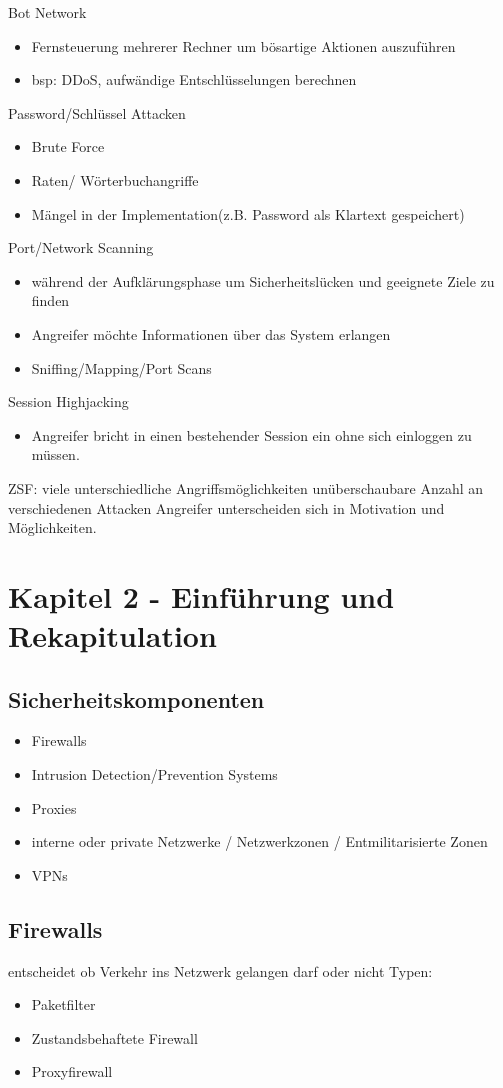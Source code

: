 \documentclass{article} %
\begin{document}
Bot Network
\begin{itemize}
	\item Fernsteuerung mehrerer Rechner um bösartige Aktionen auszuführen
    \item bsp: DDoS, aufwändige Entschlüsselungen berechnen
\end{itemize}
Password/Schlüssel Attacken
\begin{itemize}
	\item Brute Force
    \item Raten/ Wörterbuchangriffe
    \item Mängel in der Implementation(z.B. Password als Klartext gespeichert)
\end{itemize}
Port/Network Scanning

\begin{itemize}
	\item während der Aufklärungsphase um Sicherheitslücken und geeignete Ziele zu finden
    \item Angreifer möchte Informationen über das System erlangen
    \item Sniffing/Mapping/Port Scans
\end{itemize}
Session Highjacking
\begin{itemize}
	\item Angreifer bricht in einen bestehender Session ein ohne sich einloggen zu müssen.
\end{itemize}

ZSF: viele unterschiedliche Angriffsmöglichkeiten \Rightarrow unüberschaubare Anzahl an verschiedenen Attacken
Angreifer unterscheiden sich in Motivation und Möglichkeiten.
\chapter{Kapitel 2 - Einführung und Rekapitulation}
\section{Sicherheitskomponenten}
\begin{itemize}
	\item Firewalls
    \item Intrusion Detection/Prevention Systems
    \item Proxies
    \item interne oder private Netzwerke / Netzwerkzonen / Entmilitarisierte Zonen
    \item VPNs
\end{itemize}
\section{Firewalls}
entscheidet ob Verkehr ins Netzwerk gelangen darf oder nicht
Typen: 
\begin{itemize}
	\item Paketfilter
    \item Zustandsbehaftete Firewall
    \item Proxyfirewall
\end{itemize}
\end{document}
